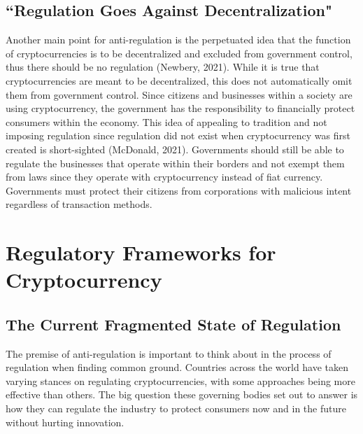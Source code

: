\documentclass{article}
\begin{document}
\subsection{``Regulation Goes Against Decentralization"}
\noindent Another main point for anti-regulation is the perpetuated idea that the function of cryptocurrencies is to be decentralized and excluded from government control, thus there should be no regulation (Newbery, 2021). While it is true that cryptocurrencies are meant to be decentralized, this does not automatically omit them from government control. Since citizens and businesses within a society are using cryptocurrency, the government has the responsibility to financially protect consumers within the economy. This idea of appealing to tradition and not imposing regulation since regulation did not exist when cryptocurrency was first created is short-sighted (McDonald, 2021). Governments should still be able to regulate the businesses that operate within their borders and not exempt them from laws since they operate with cryptocurrency instead of fiat currency. Governments must protect their citizens from corporations with malicious intent regardless of transaction methods.


\section{Regulatory Frameworks for Cryptocurrency}
\subsection{The Current Fragmented State of Regulation}

\noindent The premise of anti-regulation is important to think about in the process of regulation when finding common ground. Countries across the world have taken varying stances on regulating cryptocurrencies, with some approaches being more effective than others. The big question these governing bodies set out to answer is how they can regulate the industry to protect consumers now and in the future without hurting innovation.
\end{document}
